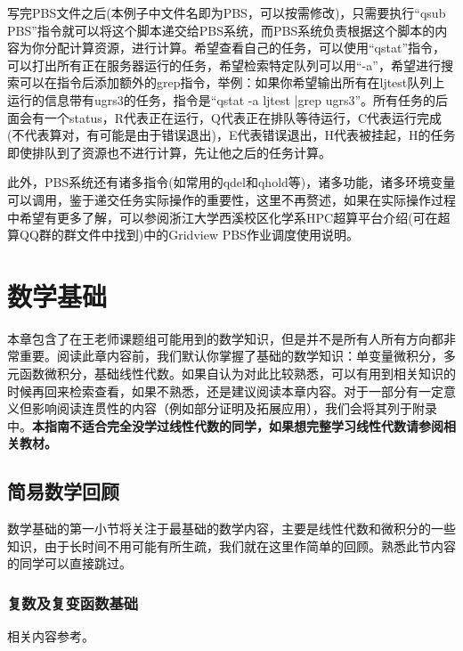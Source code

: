 \documentclass[12pt,a4paper,openany,twoside]{book}
\numberwithin{equation}{section}
\begin{document}
        写完PBS文件之后(本例子中文件名即为PBS，可以按需修改)，只需要执行“qsub PBS”指令就可以将这个脚本递交给PBS系统，而PBS系统负责根据这个脚本的内容为你分配计算资源，进行计算。希望查看自己的任务，可以使用“qstat”指令，可以打出所有正在服务器运行的任务，希望检索特定队列可以用“-a”，希望进行搜索可以在指令后添加额外的grep指令，举例：如果你希望输出所有在ljtest队列上运行的信息带有ugrs3的任务，指令是“qstat -a ljtest |grep ugrs3”。所有任务的后面会有一个status，R代表正在运行，Q代表正在排队等待运行，C代表运行完成(不代表算对，有可能是由于错误退出)，E代表错误退出，H代表被挂起，H的任务即使排队到了资源也不进行计算，先让他之后的任务计算。

        此外，PBS系统还有诸多指令(如常用的qdel和qhold等)，诸多功能，诸多环境变量可以调用，鉴于递交任务实际操作的重要性，这里不再赘述，如果在实际操作过程中希望有更多了解，可以参阅浙江大学西溪校区化学系HPC超算平台介绍(可在超算QQ群的群文件中找到)中的Gridview PBS作业调度使用说明。
      
      \chapter{数学基础}

        本章包含了在王老师课题组可能用到的数学知识，但是并不是所有人所有方向都非常重要。阅读此章内容前，我们默认你掌握了基础的数学知识：单变量微积分，多元函数微积分，基础线性代数。如果自认为对此比较熟悉，可以有用到相关知识的时候再回来检索查看，如果不熟悉，还是建议阅读本章内容。对于一部分有一定意义但影响阅读连贯性的内容（例如部分证明及拓展应用），我们会将其列于附录中。\textbf{本指南不适合完全没学过线性代数的同学，如果想完整学习线性代数请参阅相关教材。}

        \section{简易数学回顾}
      
          数学基础的第一小节将关注于最基础的数学内容，主要是线性代数和微积分的一些知识，由于长时间不用可能有所生疏，我们就在这里作简单的回顾。熟悉此节内容的同学可以直接跳过。

          \subsection{复数及复变函数基础}

            相关内容参考\cite{methods_in_math_phys_liang}。

            {}
            
\end{document}
